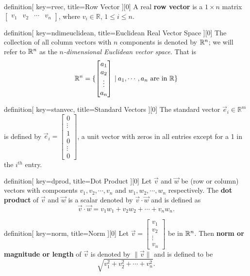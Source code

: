 \begin{SaveConcept}{definition}[
		key=rvec,
		title={Row Vector}
	][0]
	A real \textbf{row vector} is a $ 1\times n$ matrix $\begin{bmatrix} v_1&v_2&\cdots&v_n \end{bmatrix}$, where $ v_i\in \mathbb R$, $1\leq i\leq n$. 
\end{SaveConcept}


\begin{SaveConcept}{definition}[
		key=ndimeuclidean,
		title={Euclidean Real Vector Space}
	][0]
        The collection of all column vectors with $n$ components is denoted by $\mathbb{R}^n$; we will refer to $\mathbb{R}^n$ as the \textit{$n$-dimensional Euclidean vector space}. That is
        $$
        \mathbb{R}^n=\{\begin{bmatrix}
	a_1\\a_2\\\vdots\\a_n
        \end{bmatrix}\:|\: a_1,\cdots,a_n \text{ are in } \mathbb{R}\}
        $$
\end{SaveConcept}


\begin{SaveConcept}{definition}[
		key=stanvec,
		title={Standard Vectors}
	][0]
        The standard vector $\vec{e}_i\in\mathbb{R}^m$ is defined by $\vec{e}_i=\begin{bmatrix} 0\\\vdots\\ 1\\ 0 \\ \vdots\\0 \end{bmatrix}$, a unit vector with zeros in all entries except for a 1 in the $i^{th}$ entry.
\end{SaveConcept}


\begin{SaveConcept}{definition}[
		key=dprod,
		title={Dot Product}
	][0]
        Let $\vec v$ and $\vec w$ be (row or column) vectors with components $v_1,v_2,\cdots,v_n$ and $w_1,w_2,\cdots,w_n$ respectively. The \textbf{dot product} of $\vec v$ and $\vec w$ is a scalar denoted by $\vec v\cdot\vec w$ and is defined as
	$$
	\vec v\cdot\vec w=v_1w_1+v_2w_2+\cdots+v_nw_n.
	$$
\end{SaveConcept}


\begin{SaveConcept}{definition}[
		key=norm,
		title={Norm}
	][0]
        Let $\vec v=\begin{bmatrix} v_1\\v_2\\\vdots\\v_n \end{bmatrix}$ be in $\mathbb{R}^n$. Then \textbf{norm or magnitude or length} of $\vec v$ is denoted by $\|\vec v\|$ and is defined to be
	$$
	\sqrt{v_1^2+v_2^2+\cdots+v_n^2}.
	$$
\end{SaveConcept}


